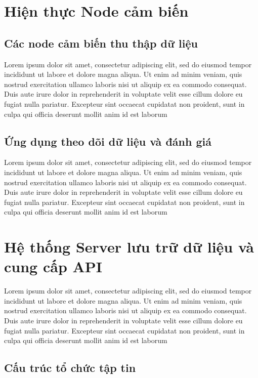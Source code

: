 \section{Hiện thực Node cảm biến}
\subsection{Các node cảm biến thu thập dữ liệu}
Lorem ipsum dolor sit amet, consectetur adipiscing elit, sed do eiusmod tempor incididunt ut labore et dolore magna aliqua. Ut enim ad minim veniam, quis nostrud exercitation ullamco laboris nisi ut aliquip ex ea commodo consequat. Duis aute irure dolor in reprehenderit in voluptate velit esse cillum dolore eu fugiat nulla pariatur. Excepteur sint occaecat cupidatat non proident, sunt in culpa qui officia deserunt mollit anim id est laborum
\subsection{Ứng dụng theo dõi dữ liệu và đánh giá}
Lorem ipsum dolor sit amet, consectetur adipiscing elit, sed do eiusmod tempor incididunt ut labore et dolore magna aliqua. Ut enim ad minim veniam, quis nostrud exercitation ullamco laboris nisi ut aliquip ex ea commodo consequat. Duis aute irure dolor in reprehenderit in voluptate velit esse cillum dolore eu fugiat nulla pariatur. Excepteur sint occaecat cupidatat non proident, sunt in culpa qui officia deserunt mollit anim id est laborum
\section{Hệ thống Server lưu trữ dữ liệu và cung cấp API}
Lorem ipsum dolor sit amet, consectetur adipiscing elit, sed do eiusmod tempor incididunt ut labore et dolore magna aliqua. Ut enim ad minim veniam, quis nostrud exercitation ullamco laboris nisi ut aliquip ex ea commodo consequat. Duis aute irure dolor in reprehenderit in voluptate velit esse cillum dolore eu fugiat nulla pariatur. Excepteur sint occaecat cupidatat non proident, sunt in culpa qui officia deserunt mollit anim id est laborum
\subsection{Cấu trúc tổ chức tập tin}
